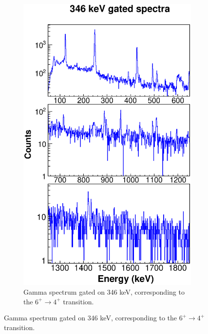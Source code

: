     \begin{figure}
    \ContinuedFloat
    \begin{subfigure}{\textwidth}
    \includegraphics[scale=0.8]{154GdTablesAndFigs/346_gamma.eps}
    \caption{Gamma spectrum gated on 346 keV, corresponding to the $6^+\rightarrow4^+$ transition.}
    \label{fig:154_6to4spec}
    \end{subfigure}
\end{figure}